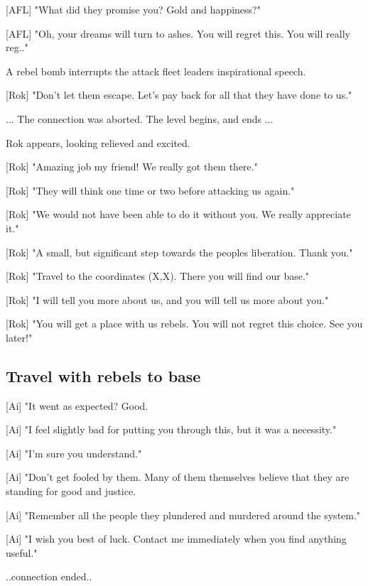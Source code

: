 \documentclass[a4paper,12pt]{article}
\begin{document}
[AFL] "What did they promise you? Gold and happiness?" 

[AFL] "Oh, your dreams will turn to ashes. You will regret this. You will really reg.."

A rebel bomb interrupts the attack fleet leaders inspirational speech.

[Rok] "Don't let them escape. Let's pay back for all that they have done to us."

... The connection was aborted. The level begins, and ends ...

Rok appears, looking relieved and excited.

[Rok] "Amazing job my friend! We really got them there." 

[Rok] "They will think one time or two before attacking us again."

[Rok] "We would not have been able to do it without you. We really appreciate it."

[Rok] "A small, but significant step towards the peoples liberation. Thank you."

[Rok] "Travel to the coordinates (X,X). There you will find our base." 

[Rok] "I will tell you more about us, and you will tell us more about you." 

[Rok] "You will get a place with us rebels. You will not regret this choice. See you later!"

\subsection{Travel with rebels to base}

[Ai] "It went as expected? Good. 

[Ai] "I feel slightly bad for putting you through this, but it was a necessity." 

[Ai] "I'm sure you understand."

[Ai] "Don't get fooled by them. Many of them themselves believe that they
are standing for good and justice.

[Ai] "Remember all the people they plundered and murdered around the system."

[Ai] "I wish you best of luck. Contact me immediately when you find anything useful."

..connection ended..
\end{document}
